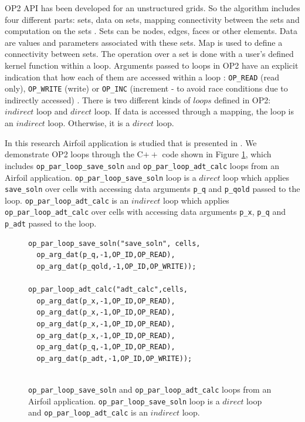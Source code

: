 \documentclass[conference]{IEEEtran}
\begin{document}
OP2 API has been developed for an unstructured grids. So the algorithm includes four different parts: sets, data on sets, mapping connectivity between the sets and computation on the sets \cite{o2,o7}. Sets can be nodes, edges, faces or other elements. Data are values and parameters associated with these sets. Map is used to define a connectivity between sets. The operation over a set is done with a user's defined kernel function within a loop. Arguments passed to loops in OP2 have an explicit indication that how each of them are accessed within a loop : \texttt{OP\_READ} (read only), \texttt{OP\_WRITE} (write) or \texttt{OP\_INC} (increment - to avoid race conditions due to indirectly accessed) \cite{o1}. There is two different kinds of $loops$ defined in OP2: $indirect$ loop and $direct$ loop. If data is accessed through a mapping, the loop is an $indirect$ loop. Otherwise, it is a $direct$ loop. 

In this research Airfoil application is studied that is presented in \cite{o8}. We demonstrate OP2 loops through the C$++$ code shown in Figure \ref{o1}, which includes \texttt{op\_par\_loop\_save\_soln} and \texttt{op\_par\_loop\_adt\_calc} loops from an Airfoil application. \texttt{op\_par\_loop\_save\_soln} loop is a $direct$ loop which applies \texttt{save\_soln} over cells with accessing data arguments \texttt{p\_q} and \texttt{p\_qold} passed to the loop. \texttt{op\_par\_loop\_adt\_calc} is an $indirect$ loop which applies \texttt{op\_par\_loop\_adt\_calc} over cells with accessing data arguments \texttt{p\_x}, \texttt{p\_q} and \texttt{p\_adt} passed to the loop. 

\begin{figure} 
    \begin{lstlisting}
op_par_loop_save_soln("save_soln", cells,
  op_arg_dat(p_q,-1,OP_ID,OP_READ),
  op_arg_dat(p_qold,-1,OP_ID,OP_WRITE));
  
op_par_loop_adt_calc("adt_calc",cells,
  op_arg_dat(p_x,-1,OP_ID,OP_READ),
  op_arg_dat(p_x,-1,OP_ID,OP_READ),
  op_arg_dat(p_x,-1,OP_ID,OP_READ),
  op_arg_dat(p_x,-1,OP_ID,OP_READ),
  op_arg_dat(p_q,-1,OP_ID,OP_READ),
  op_arg_dat(p_adt,-1,OP_ID,OP_WRITE));
  
    \end{lstlisting}
    \caption{\small{\texttt{op\_par\_loop\_save\_soln} and \texttt{op\_par\_loop\_adt\_calc} loops from an Airfoil application.  \texttt{op\_par\_loop\_save\_soln} loop is a $direct$ loop and \texttt{op\_par\_loop\_adt\_calc} is an $indirect$ loop.}}
    \label{o1}
\end{figure}
\end{document}
